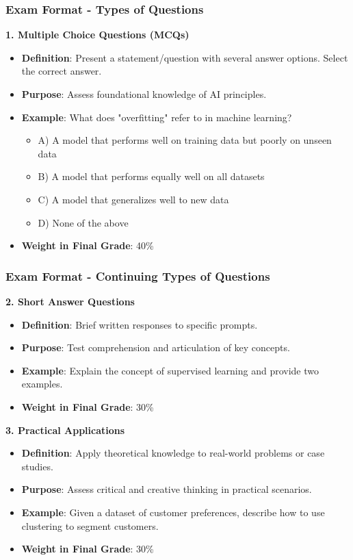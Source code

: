 \documentclass[aspectratio=169]{beamer}
\begin{document}
\begin{frame}[fragile]
    \frametitle{Exam Format - Types of Questions}
    
    \textbf{1. Multiple Choice Questions (MCQs)}  
        \begin{itemize}
            \item \textbf{Definition}: Present a statement/question with several answer options. Select the correct answer.
            \item \textbf{Purpose}: Assess foundational knowledge of AI principles.
            \item \textbf{Example}: What does "overfitting" refer to in machine learning?
                \begin{itemize}
                    \item A) A model that performs well on training data but poorly on unseen data
                    \item B) A model that performs equally well on all datasets
                    \item C) A model that generalizes well to new data
                    \item D) None of the above
                \end{itemize}
            \item \textbf{Weight in Final Grade}: 40\%
        \end{itemize}
\end{frame}

\begin{frame}[fragile]
    \frametitle{Exam Format - Continuing Types of Questions}
    
    \textbf{2. Short Answer Questions}  
        \begin{itemize}
            \item \textbf{Definition}: Brief written responses to specific prompts.
            \item \textbf{Purpose}: Test comprehension and articulation of key concepts.
            \item \textbf{Example}: Explain the concept of supervised learning and provide two examples.
            \item \textbf{Weight in Final Grade}: 30\%
        \end{itemize}

    \textbf{3. Practical Applications}  
        \begin{itemize}
            \item \textbf{Definition}: Apply theoretical knowledge to real-world problems or case studies.
            \item \textbf{Purpose}: Assess critical and creative thinking in practical scenarios.
            \item \textbf{Example}: Given a dataset of customer preferences, describe how to use clustering to segment customers.
            \item \textbf{Weight in Final Grade}: 30\%
        \end{itemize}
\end{frame}
\end{document}
